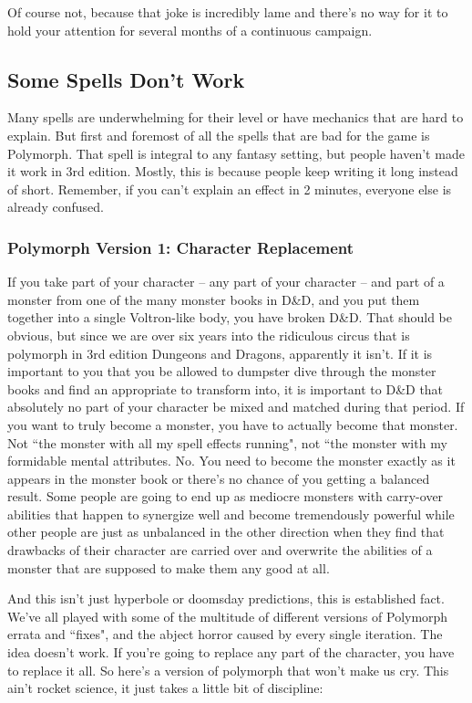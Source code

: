 Of course not, because that joke is incredibly lame and there's no way for it to hold your attention for several months of a continuous campaign.

\subsection{Some Spells Don't Work}

Many spells are underwhelming for their level or have mechanics that are hard to explain. But first and foremost of all the spells that are bad for the game is Polymorph. That spell is integral to any fantasy setting, but people haven't made it work in 3rd edition. Mostly, this is because people keep writing it long instead of short. Remember, if you can't explain an effect in 2 minutes, everyone else is already confused.

\subsubsection{Polymorph Version 1: Character Replacement}

If you take part of your character -- any part of your character -- and part of a monster from one of the many monster books in D\&D, and you put them together into a single Voltron-like body, you have broken D\&D. That should be obvious, but since we are over six years into the ridiculous circus that is polymorph in 3rd edition Dungeons and Dragons, apparently it isn't. If it is important to you that you be allowed to dumpster dive through the monster books and find an appropriate to transform into, it is important to D\&D that absolutely no part of your character be mixed and matched during that period. If you want to truly become a monster, you have to actually become that monster. Not ``the monster with all my spell effects running", not ``the monster with my formidable mental attributes. No. You need to become the monster exactly as it appears in the monster book or there's no chance of you getting a balanced result. Some people are going to end up as mediocre monsters with carry-over abilities that happen to synergize well and become tremendously powerful while other people are just as unbalanced in the other direction when they find that drawbacks of their character are carried over and overwrite the abilities of a monster that are supposed to make them any good at all.

And this isn't just hyperbole or doomsday predictions, this is established fact. We've all played with some of the multitude of different versions of Polymorph errata and ``fixes", and the abject horror caused by every single iteration. The idea doesn't work. If you're going to replace any part of the character, you have to replace it all. So here's a version of polymorph that won't make us cry. This ain't rocket science, it just takes a little bit of discipline:

